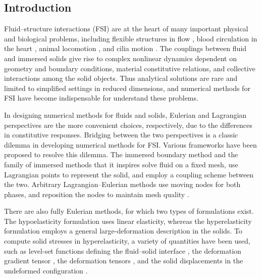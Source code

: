 \documentclass[times, 10pt]{article}
\begin{document}
\begin{multicols}{2}
\section*{Introduction}

Fluid--structure interactions (FSI) are at the heart of many important physical and biological problems,
including flexible structures in flow \cite{luhar11, bukowicki19},
blood circulation in the heart \cite{peskin72, griffith09},
animal locomotion \cite{lucas14,lim2019}, and cilia motion \cite{kanso17,kanso2018}.
The couplings between fluid and immersed solids give rise to complex nonlinear dynamics dependent on geometry and boundary conditions, material constitutive relations, and collective interactions among the solid objects.
Thus analytical solutions are rare and limited to simplified settings in reduced dimensions, and numerical methods for FSI have become indispensable for understand these problems.

In designing numerical methods for fluids and solids, Eulerian and Lagrangian perspectives are the more convenient choices, respectively, due to the differences in constitutive responses.
Bridging between the two perspectives is a classic dilemma in developing numerical methods for FSI.
Various frameworks have been proposed to resolve this dilemma.
The immersed boundary method \cite{peskin72, peskin02} and the family of immersed methods that it inspires \cite{griffith09, fai18, griffith20} solve fluid on a fixed mesh, use Lagrangian points to represent the solid, and employ a coupling scheme between the two.
Arbitrary Lagrangian--Eulerian methods use moving nodes for both phases, and reposition the nodes to maintain mesh quality \cite{hirt74, rugonyi01}.

There are also fully Eulerian methods, for which two types of formulations exist.
The hypoelasticity formulation \cite{truesdell55, udaykumar03, rycroft12} uses linear elasticity, whereas the hyperelasticity formulation employs a general large-deformation description in the solids.
To compute solid stresses in hyperelasticity, a variety of quantities have been used, such as level-set functions defining the fluid--solid interface \cite{maitre09}, the deformation gradient tensor \cite{liu01}, the deformation tensors \cite{sugiyama11}, and the solid displacements in the undeformed configuration \cite{dunne06, richter13, wick13}.


\end{multicols}
\end{document}
